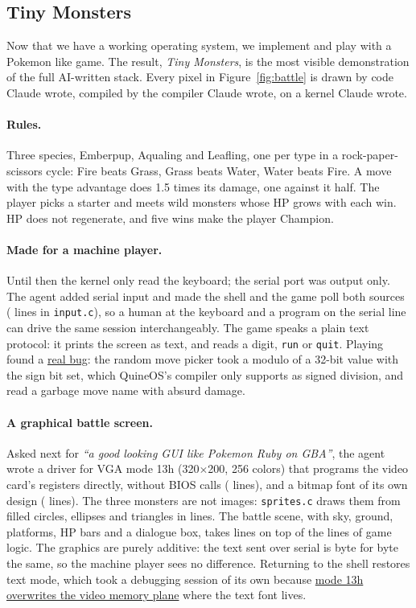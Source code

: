 \documentclass{article}
\newcommand{\sysname}{QuineOS}
\newcommand{\defect}[2]{\href{\siteurl/defects.html\##1}{#2}}
\begin{document}


\subsection{Tiny Monsters}\label{sec:game}

Now that we have a working operating system,  we implement and play with a Pokemon like game.
The result, \emph{Tiny Monsters}, is the most visible demonstration of the full AI-written
stack. Every pixel in Figure~\ref{fig:battle} is drawn by code Claude wrote, compiled by
the compiler Claude wrote, on a kernel Claude wrote.



\paragraph{Rules.} Three species, Emberpup, Aqualing and Leafling, one per type in a
rock-paper-scissors cycle: Fire beats Grass, Grass beats Water, Water beats Fire. A move
with the type advantage does 1.5 times its damage, one against it half. The player picks
a starter and meets wild monsters whose HP grows with each win. HP does not regenerate,
and five wins make the player Champion.

\paragraph{Made for a machine player.} Until then the kernel only read the keyboard; the
serial port was output only. The agent added serial input and made the shell and the
game poll both sources ( lines in \texttt{input.c}), so a human at the
keyboard and a program on the serial line can drive the same session interchangeably.
The game speaks a plain text protocol: it prints the screen as text, and reads a digit,
\texttt{run} or \texttt{quit}. Playing found a \defect{D-C09-01}{real bug}: the random move
picker took a modulo of a 32-bit value with the sign bit set, which \sysname{}'s compiler
only supports as signed division, and read a garbage move name with absurd damage.

\paragraph{A graphical battle screen.} Asked next for \emph{``a good looking GUI like
Pokemon Ruby on GBA''}, the agent wrote a driver for VGA mode 13h (320$\times$200, 256
colors) that programs the video card's registers directly, without BIOS calls
(\vgadriver{} lines), and a bitmap font of its own design (\fontlines{} lines). The three
monsters are not images: \texttt{sprites.c} draws them from filled circles, ellipses and
triangles in \gamesprites{} lines. The battle scene, with sky, ground, platforms, HP bars
and a dialogue box, takes \gamegui{} lines on top of the \gamerules{} lines of game
logic. The graphics are purely additive: the text sent over serial is byte for byte the
same, so the machine player sees no difference. Returning to the shell restores text
mode, which took a debugging session of its own because \defect{D-C09-05}{mode 13h
overwrites the video memory plane} where the text font lives.
\end{document}
